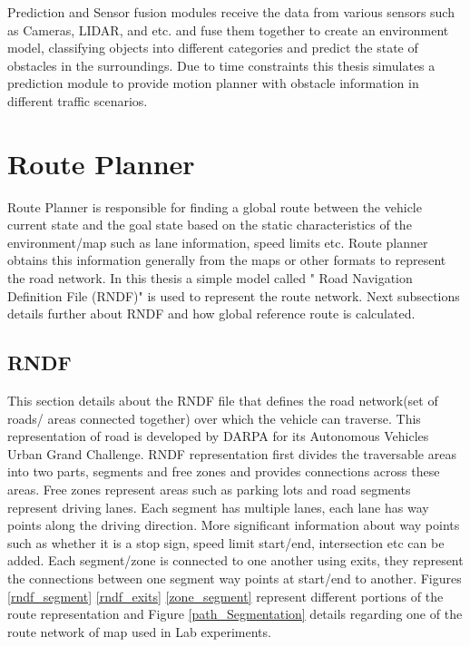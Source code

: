 Prediction and Sensor fusion modules receive the data from various sensors such as Cameras, LIDAR, and etc. and fuse them together to create an environment model, classifying objects into different categories and predict the state of obstacles in the surroundings. Due to time constraints this thesis simulates a prediction module to provide motion planner with obstacle information in different traffic scenarios.

\section{Route Planner} \label{route_planner}
Route Planner is responsible for finding a global route between the vehicle current state and the goal state based on the static characteristics of the environment/map such as lane information, speed limits etc. Route planner obtains this information generally from the maps or other formats to represent the road network. In this thesis a simple model called " Road Navigation Definition File (RNDF)"  \cite{rndf_darpa} \cite{rndf_fu} is used to represent the route network. Next subsections details further about RNDF and how global reference route is calculated.

\subsection{RNDF}

This section details about the RNDF file \cite{rndf_darpa} that defines the road network(set of roads/ areas connected together) over which the vehicle can traverse. This representation of road is developed by DARPA for its Autonomous Vehicles Urban Grand Challenge. RNDF representation first divides the traversable areas into two parts, segments and free zones and provides connections across these areas. Free zones represent areas such as parking lots and road segments represent driving lanes. Each segment has multiple lanes, each lane has way points along the driving direction. More significant information about way points such as whether it is a stop sign, speed limit start/end, intersection etc can be added. Each segment/zone is connected to one another using exits, they represent the connections between one segment way points at start/end to another. Figures \ref{rndf_segment} \ref{rndf_exits} \ref{zone_segment} \cite{rndf_darpa} represent different portions of the route representation and Figure \ref{path_Segmentation} details regarding one of the route network of map used in Lab experiments. 


